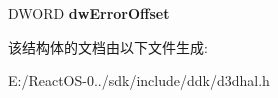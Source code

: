 \begin{DoxyCompactItemize}
\begin{tabbing}
\end{tabbing}\item 
\mbox{\label{struct___d3_d_h_a_l___d_r_a_w_p_r_i_m_i_t_i_v_e_s2_d_a_t_a_a90c79211c346e0e10716b05863f5ce39}} 
D\+W\+O\+RD {\bfseries dw\+Error\+Offset}
\end{DoxyCompactItemize}


该结构体的文档由以下文件生成\+:\begin{DoxyCompactItemize}
\item 
E\+:/\+React\+O\+S-\/0../sdk/include/ddk/d3dhal.\+h\end{DoxyCompactItemize}

